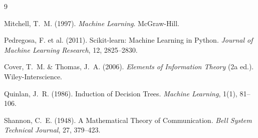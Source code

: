 \documentclass[12pt, letterpaper]{article}
\begin{document}
\newpage
\begin{thebibliography}{9}

    Mitchell, T.~M. (1997).
    \textit{Machine Learning}.
    McGraw-Hill.

    Pedregosa, F. et al. (2011).
    Scikit-learn: Machine Learning in Python.
    \textit{Journal of Machine Learning Research}, 12, 2825--2830.

    Cover, T.~M. \& Thomas, J.~A. (2006).
    \textit{Elements of Information Theory} (2a ed.).
    Wiley-Interscience.

    Quinlan, J.~R. (1986).
    Induction of Decision Trees.
    \textit{Machine Learning}, 1(1), 81--106.

    Shannon, C.~E. (1948).
    A Mathematical Theory of Communication.
    \textit{Bell System Technical Journal}, 27, 379--423.

\end{thebibliography}
\end{document}
